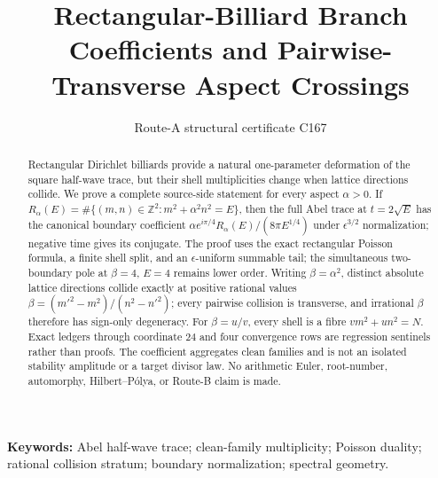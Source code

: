 \documentclass[10pt]{article}
\title{\vspace{-1.7em}Rectangular-Billiard Branch Coefficients and Pairwise-Transverse Aspect Crossings}
\author{Route-A structural certificate C167}
\date{}
\begin{document}
\maketitle
\vspace{-1.2em}
\begin{abstract}
Rectangular Dirichlet billiards provide a natural one-parameter deformation of
the square half-wave trace, but their shell multiplicities change when lattice
directions collide.  We prove a complete source-side statement for every
aspect $\alpha>0$.  If
$R_\alpha(E)=\#\{(m,n)\in\mathbb Z^2:m^2+\alpha^2n^2=E\}$, then the full Abel
trace at $t=2\sqrt E$ has the canonical boundary coefficient
$\alpha e^{i\pi/4}R_\alpha(E)/(8\pi E^{1/4})$ under
$\epsilon^{3/2}$ normalization; negative time gives its conjugate.  The proof
uses the exact rectangular Poisson formula, a finite shell split, and an
$\epsilon$-uniform summable tail; the simultaneous two-boundary pole at
$\beta=4$, $E=4$ remains lower order.  Writing $\beta=\alpha^2$, distinct absolute
lattice directions collide exactly at positive rational values
$\beta=(m'^2-m^2)/(n^2-n'^2)$; every pairwise collision is transverse, and
irrational $\beta$ therefore has sign-only degeneracy.  For $\beta=u/v$,
every shell is a fibre
$vm^2+un^2=N$.  Exact ledgers through coordinate $24$ and four convergence
rows are regression sentinels rather than proofs.  The coefficient aggregates
clean families and is not an isolated stability amplitude or a target divisor
law.  No arithmetic Euler, root-number, automorphy, Hilbert--P\'olya, or
Route-B claim is made.
\end{abstract}
\noindent\textbf{Keywords:} Abel half-wave trace; clean-family multiplicity;
Poisson duality; rational collision stratum; boundary normalization; spectral geometry.
\end{document}
